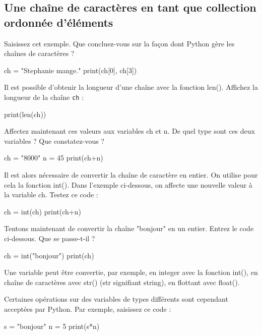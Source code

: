 \subsection{Une chaîne de caractères en tant que collection ordonnée d'éléments}

 Saisissez cet exemple. Que concluez-vous sur la fa\c con dont Python gère les
chaînes de caractères ?

\begin{python}
ch = "Stephanie mange."
print(ch[0], ch[3])
\end{python}


 Il est possible d'obtenir la longueur d'une chaîne avec la fonction len(). Affichez la longueur de la chaîne \texttt{ch} :
\begin{python}
print(len(ch))
\end{python}

 Affectez maintenant ces valeurs aux variables ch et n. De quel type sont ces deux
variables ? Que constatez-vous ?
\begin{python}
ch = "8000"
n = 45
print(ch+n)
\end{python}

 Il est alors nécessaire de convertir la chaîne de caractère en entier. On utilise pour cela la fonction int(). Dans l'exemple ci-dessous, on affecte une nouvelle valeur à la variable ch. Testez ce code :

\begin{python}
ch = int(ch)
print(ch+n)
\end{python}

 Tentons maintenant de convertir la chaîne "bonjour" en un entier. Entrez le code ci-dessous. Que se passe-t-il ?

\begin{python}
ch = int("bonjour")
print(ch)
\end{python}

Une variable peut être convertie, par exemple, en integer avec la fonction int(), en chaîne de caractères avec str() (str signifiant string), en flottant avec float().

 Certaines opérations sur des variables de types différents sont cependant
acceptées par Python. Par exemple, saisissez ce code :

\begin{python}
s = "bonjour"
n = 5
print(s*n)
\end{python}

